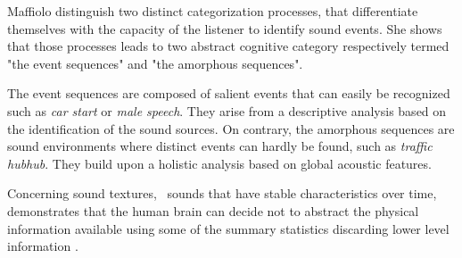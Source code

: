 \documentclass[twoside,twocolumn]{article}
\begin{document}
Maffiolo \cite{maffiolo_caracterisation_1999} distinguish two distinct categorization processes, that differentiate themselves with the capacity of the listener to identify sound events. She shows that those processes leads to two abstract cognitive category respectively termed "the event sequences" and "the amorphous sequences".


The event sequences are composed of salient events that can easily be recognized such as \emph{car start} or \emph{male speech}. They arise from a descriptive analysis based on the identification of the sound sources. On contrary, the amorphous sequences are sound environments where distinct events can hardly be found, such as \emph{traffic hubhub}. They build upon a holistic analysis based on global acoustic features.


Concerning sound textures, \ie~sounds that have stable characteristics over time, \cite{mcdermott2011sound,mcdermott2013summary} demonstrates that the human brain can decide not to abstract the physical information available using some of the summary statistics discarding lower level information \cite{nelken2013ear}.

\end{document}

